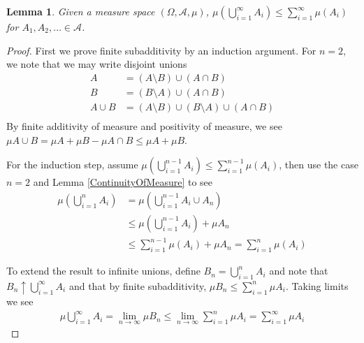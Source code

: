 \documentclass{amsart}
\newtheorem{lem}[thm]{Lemma}
\theoremstyle{remark}
\theoremstyle{definition}
\begin{document}
\begin{lem}Given a measure space $(\Omega, \mathcal{A}, \mu)$, $\mu
  \left (\bigcup_{i=1}^\infty A_i \right ) \leq \sum_{i=1}^\infty \mu(A_i)$  for $A_1, A_2, \dots \in \mathcal{A}$.
\end{lem}
\begin{proof}First we prove finite subadditivity by an induction argument.  For $n=2$, we note that we may
  write disjoint unions
\begin{align*}
A &= (A \setminus B) \cup (A \cap B) \\
B  &= (B\setminus A) \cup (A \cap B) \\
A \cup B  &= (A\setminus B)  \cup (B\setminus A) \cup (A \cap B) \\
\end{align*}
By finite additivity of measure and positivity of measure, we see $\mu A \cup B = \mu A + \mu B
- \mu A \cap B \leq \mu A + \mu B$. 

For the induction step, assume $\mu \left (\bigcup_{i=1}^{n-1} A_i \right
) \leq \sum_{i=1}^{n-1} \mu(A_i)$, then use the case $n=2$ and
Lemma \ref{ContinuityOfMeasure} to see
\begin{align*}
\mu \left (\bigcup_{i=1}^{n} A_i \right) &= \mu \left
  (\bigcup_{i=1}^{n-1} A_i  \cup A_n\right) \\
&\leq \mu \left (\bigcup_{i=1}^{n-1} A_i \right ) + \mu A_n \\
&\leq \sum_{i=1}^{n-1} \mu(A_i) + \mu A_n = \sum_{i=1}^n \mu(A_i)
\end{align*}

To extend the result to infinite unions, define $B_n = \bigcup_{i=1}^n
A_i$ and note that $B_n \uparrow \bigcup_{i=1}^\infty
A_i$ and that by finite subadditivity, $\mu B_n \leq \sum_{i=1}^n \mu
A_i$.  Taking limits we see
\begin{align*}
\mu \bigcup_{i=1}^\infty A_i = \lim_{n \to \infty} \mu B_n \leq \lim_{n
  \to \infty} \sum_{i=1}^n \mu A_i = \sum_{i=1}^\infty \mu A_i
\end{align*}
\end{proof}
\end{document}
